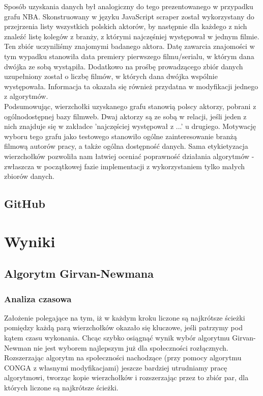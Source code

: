 \documentclass{article}
\begin{document}
Sposób uzyskania danych był analogiczny do tego prezentowanego w przypadku grafu NBA. Skonstruowany w języku JavaScript scraper został wykorzystany do przejrzenia listy wszystkich polskich aktorów, by następnie dla każdego z nich znaleźć listę kolegów z branży, z którymi najczęśniej występował w jednym filmie. Ten zbiór uczyniliśmy znajomymi badanego aktora. Datę zawarcia znajomości w tym wypadku stanowiła data premiery pierwszego filmu/serialu, w którym dana dwójka ze sobą wystąpiła. Dodatkowo na prośbę prowadzącego zbiór danych uzupełniony został o liczbę filmów, w których dana dwójka wspólnie występowała. Informacja ta okazała się również przydatna w modyfikacji jednego z algorytmów.\\

Podsumowując, wierzchołki uzyskanego grafu stanowią polscy aktorzy, pobrani z ogólnodostępnej bazy filmweb. Dwaj aktorzy są ze sobą w relacji, jeśli jeden z nich znajduje się w zakładce 'najczęściej występował z ...' u drugiego. Motywację wyboru tego grafu jako testowego stanowiło ogólne zainteresowanie branżą filmową autorów pracy, a także ogólna dostępność danych. Sama etykietyzacja wierzchołków pozwoliła nam łatwiej oceniać poprawność działania algorytmów - zwłaszcza w początkowej fazie implementacji z wykorzystaniem tylko małych zbiorów danych.

\subsection{GitHub}

\section{Wyniki}

\subsection{Algorytm Girvan-Newmana}
\subsubsection{Analiza czasowa}
Założenie polegające na tym, iż w każdym kroku liczone są najkrótsze ścieżki pomiędzy każdą parą wierzchołków okazało się kluczowe, jeśli patrzymy pod kątem czasu wykonania. Chcąc szybko osiągnąć wynik wybór algorytmu Girvan-Newman nie jest wyborem najlepszym już dla społeczności rozłącznych. Rozszerzając algorytm na społeczności nachodzące (przy pomocy algorytmu CONGA z własnymi modyfikacjami) jeszcze bardziej utrudniamy pracę algorytmowi, tworząc kopie wierzchołków i rozszerzając przez to zbiór par, dla których liczone są najkrótsze ścieżki.
\end{document}
